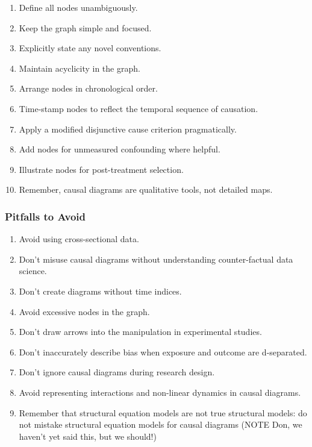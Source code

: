 \documentclass[
  singlecolumn]{article}
\providecommand{\tightlist}{%
  \setlength{\itemsep}{0pt}\setlength{\parskip}{0pt}}\usepackage{longtable,booktabs,array}
\begin{document}
\begin{enumerate}
\def\labelenumi{\arabic{enumi}.}
\tightlist
\item
  Define all nodes unambiguously.
\item
  Keep the graph simple and focused.
\item
  Explicitly state any novel conventions.
\item
  Maintain acyclicity in the graph.
\item
  Arrange nodes in chronological order.
\item
  Time-stamp nodes to reflect the temporal sequence of causation.
\item
  Apply a modified disjunctive cause criterion pragmatically.
\item
  Add nodes for unmeasured confounding where helpful.
\item
  Illustrate nodes for post-treatment selection.
\item
  Remember, causal diagrams are qualitative tools, not detailed maps.
\end{enumerate}

\hypertarget{pitfalls-to-avoid}{%
\subsubsection{Pitfalls to Avoid}\label{pitfalls-to-avoid}}

\begin{enumerate}
\def\labelenumi{\arabic{enumi}.}
\tightlist
\item
  Avoid using cross-sectional data.
\item
  Don't misuse causal diagrams without understanding counter-factual
  data science.
\item
  Don't create diagrams without time indices.
\item
  Avoid excessive nodes in the graph.
\item
  Don't draw arrows into the manipulation in experimental studies.
\item
  Don't inaccurately describe bias when exposure and outcome are
  d-separated.
\item
  Don't ignore causal diagrams during research design.
\item
  Avoid representing interactions and non-linear dynamics in causal
  diagrams.
\item
  Remember that structural equation models are not true structural
  models: do not mistake structural equation models for causal diagrams
  (NOTE Don, we haven't yet said this, but we should!)
\end{enumerate}
\end{document}
